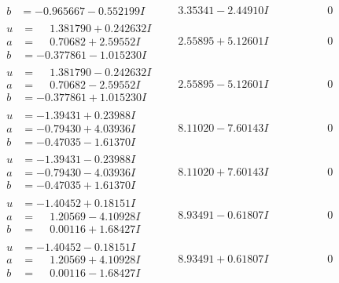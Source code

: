 \documentclass[1p]{elsarticle_modified}
\theoremstyle{definition}
\begin{document}
$$\begin{array}{c|c|c}
\begin{aligned}
b &= -0.965667 - 0.552199 I\end{aligned}
 & \phantom{-}3.35341 - 2.44910 I & \phantom{-0.000000 } 0 \\ \hline\begin{aligned}
u &= \phantom{-}1.381790 + 0.242632 I \\
a &= \phantom{-}0.70682 + 2.59552 I \\
b &= -0.377861 - 1.015230 I\end{aligned}
 & \phantom{-}2.55895 + 5.12601 I & \phantom{-0.000000 } 0 \\ \hline\begin{aligned}
u &= \phantom{-}1.381790 - 0.242632 I \\
a &= \phantom{-}0.70682 - 2.59552 I \\
b &= -0.377861 + 1.015230 I\end{aligned}
 & \phantom{-}2.55895 - 5.12601 I & \phantom{-0.000000 } 0 \\ \hline\begin{aligned}
u &= -1.39431 + 0.23988 I \\
a &= -0.79430 + 4.03936 I \\
b &= -0.47035 - 1.61370 I\end{aligned}
 & \phantom{-}8.11020 - 7.60143 I & \phantom{-0.000000 } 0 \\ \hline\begin{aligned}
u &= -1.39431 - 0.23988 I \\
a &= -0.79430 - 4.03936 I \\
b &= -0.47035 + 1.61370 I\end{aligned}
 & \phantom{-}8.11020 + 7.60143 I & \phantom{-0.000000 } 0 \\ \hline\begin{aligned}
u &= -1.40452 + 0.18151 I \\
a &= \phantom{-}1.20569 - 4.10928 I \\
b &= \phantom{-}0.00116 + 1.68427 I\end{aligned}
 & \phantom{-}8.93491 - 0.61807 I & \phantom{-0.000000 } 0 \\ \hline\begin{aligned}
u &= -1.40452 - 0.18151 I \\
a &= \phantom{-}1.20569 + 4.10928 I \\
b &= \phantom{-}0.00116 - 1.68427 I\end{aligned}
 & \phantom{-}8.93491 + 0.61807 I & \phantom{-0.000000 } 0 \\ \hline\begin{aligned}

\end{aligned}
\end{array}$$
\end{document}
